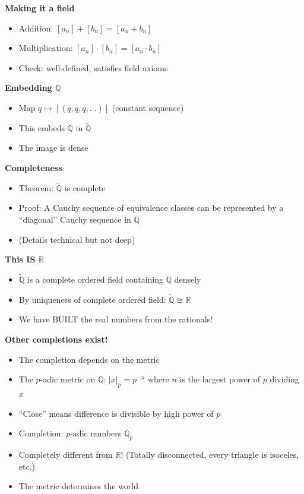 \documentclass[
  10pt,
  letterpaper,
]{scrbook}
\providecommand{\tightlist}{%
  \setlength{\itemsep}{0pt}\setlength{\parskip}{0pt}}
\begin{document}
\textbf{Making it a field}

\begin{itemize}
\tightlist
\item
  Addition: \([a_n] + [b_n] = [a_n + b_n]\)
\item
  Multiplication: \([a_n] \cdot [b_n] = [a_n \cdot b_n]\)
\item
  Check: well-defined, satisfies field axioms
\end{itemize}

\textbf{Embedding \(\mathbb{Q}\)}

\begin{itemize}
\tightlist
\item
  Map \(q \mapsto [(q, q, q, \ldots)]\) (constant sequence)
\item
  This embeds \(\mathbb{Q}\) in \(\tilde{\mathbb{Q}}\)
\item
  The image is dense
\end{itemize}

\textbf{Completeness}

\begin{itemize}
\tightlist
\item
  Theorem: \(\tilde{\mathbb{Q}}\) is complete
\item
  Proof: A Cauchy sequence of equivalence classes can be represented by
  a ``diagonal'' Cauchy sequence in \(\mathbb{Q}\)
\item
  (Details technical but not deep)
\end{itemize}

\textbf{This IS \(\mathbb{R}\)}

\begin{itemize}
\tightlist
\item
  \(\tilde{\mathbb{Q}}\) is a complete ordered field containing
  \(\mathbb{Q}\) densely
\item
  By uniqueness of complete ordered field:
  \(\tilde{\mathbb{Q}} \cong \mathbb{R}\)
\item
  We have BUILT the real numbers from the rationals!
\end{itemize}

\textbf{Other completions exist!}

\begin{itemize}
\tightlist
\item
  The completion depends on the metric
\item
  The \(p\)-adic metric on \(\mathbb{Q}\): \(|x|_p = p^{-n}\) where
  \(n\) is the largest power of \(p\) dividing \(x\)
\item
  ``Close'' means difference is divisible by high power of \(p\)
\item
  Completion: \(p\)-adic numbers \(\mathbb{Q}_p\)
\item
  Completely different from \(\mathbb{R}\)! (Totally disconnected, every
  triangle is isoceles, etc.)
\item
  The metric determines the world
\end{itemize}
\end{document}
